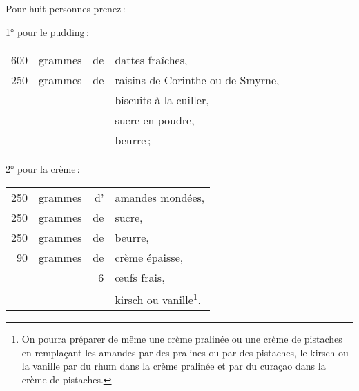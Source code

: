 Pour huit personnes prenez :

\medskip

1° pour le pudding :

\footnotesize
\begin{longtable}{rrrp{16em}}
    600 & grammes & de & dattes fraîches,                                                                 \\
    250 & grammes & de & raisins de Corinthe ou de Smyrne,                                                \\
        &         &    & biscuits à la cuiller,                                                           \\
        &         &    & sucre en poudre,                                                                 \\
        &         &    & beurre ;                                                                         \\
\end{longtable}
\normalsize

2° pour la crème :

\footnotesize
\begin{longtable}{rrrp{16em}}
    250 & grammes & d' & amandes mondées,                                                                 \\
    250 & grammes & de & sucre,                                                                           \\
    250 & grammes & de & beurre,                                                                          \\
     90 & grammes & de & crème épaisse,                                                                   \\
        &         &  6 & œufs frais,                                                                      \\
        &         &    & kirsch ou vanille\footnote{\index{Créme de pistaches}
                                                    \index{Créme pralinée}
                         On pourra préparer de même une
                         crème pralinée ou une crème de pistaches en remplaçant les
                         amandes par des pralines ou par des pistaches, le kirsch ou
                         la vanille par du rhum dans la crème pralinée et par du curaçao
                         dans la crème de pistaches.}.                                                    \\
\end{longtable}
\normalsize

